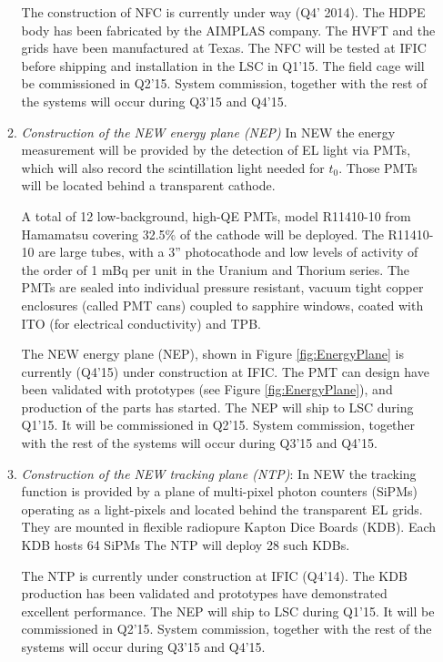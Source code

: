 \begin{enumerate}
\begin{enumerate}
The construction of NFC is currently under way (Q4' 2014). The HDPE body has been fabricated by the AIMPLAS company. The HVFT and the grids have been manufactured at Texas. The  NFC will be tested at IFIC before shipping and installation in the LSC in Q1'15. The field cage will be commissioned in Q2'15. System commission, together with the rest of the systems will occur during Q3'15 and Q4'15.

\item {\em Construction of the NEW energy plane (NEP)}
In NEW the energy measurement will be provided by the detection of EL light via PMTs, which will also record the scintillation light needed for $t_0$. Those PMTs will be located behind a transparent cathode.

A total of 12 low-background, high-QE PMTs, model R11410-10 from Hamamatsu covering 32.5\% of the cathode will be deployed. The R11410-10 are large tubes, with a 3'' photocathode and low levels of  activity of the order of 1 mBq per unit in the Uranium and Thorium series. The PMTs are sealed into individual pressure resistant, vacuum tight copper enclosures (called PMT cans) coupled to 
sapphire windows, coated with ITO (for electrical conductivity) and TPB. 

The NEW energy plane (NEP), shown in Figure \ref{fig:EnergyPlane}
is currently (Q4'15) under construction at IFIC. The PMT can design have been validated with prototypes (see Figure  \ref{fig:EnergyPlane}), and production of the parts has started. The NEP will ship to LSC during Q1'15. It will be commissioned in Q2'15. System commission, together with the rest of the systems will occur during Q3'15 and Q4'15.

\item  {\em  Construction of the NEW tracking plane (NTP)}:
In NEW the tracking function is provided by a plane of multi-pixel photon counters (SiPMs) operating as a light-pixels and located behind the transparent EL grids. They are mounted in flexible radiopure Kapton Dice Boards (KDB). Each KDB hosts 64 SiPMs The NTP will deploy 28 such KDBs. 

The NTP is currently under construction at IFIC (Q4'14). The KDB production has been validated and prototypes have demonstrated excellent performance. The NEP will ship to LSC during Q1'15. It will be commissioned in Q2'15. System commission, together with the rest of the systems will occur during Q3'15 and Q4'15. 

\end{enumerate}
 

\end{enumerate}

